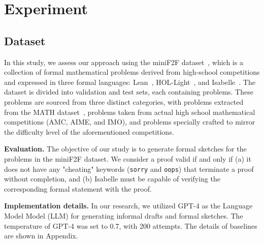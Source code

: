 \documentclass{article} \usepackage{iclr2024_conference,times}
\begin{document}
\section{Experiment}
\subsection{Dataset}
In this study, we assess our approach using the miniF2F dataset~\citep{zheng2021minif2f}, which is a collection of  formal mathematical problems derived from high-school competitions and expressed in three formal languages: Lean~\citep{de2015lean}, HOL-Light~\citep{bansal2019holist}, and Isabelle~\citep{paulson1994isabelle}. The dataset is divided into validation and test sets, each containing  problems. These problems are sourced from three distinct categories, with  problems extracted from the MATH dataset~\citep{hendrycks2021measuring},  problems taken from actual high school mathematical competitions (AMC, AIME, and IMO), and  problems specially crafted to mirror the difficulty level of the aforementioned competitions.

\textbf{Evaluation.} The objective of our study is to generate formal sketches for the problems in the miniF2F dataset. We consider a proof valid if and only if (a) it does not have any "cheating" keywords (\texttt{sorry} and \texttt{oops}) that terminate a proof without completion, and (b) Isabelle must be capable of verifying the corresponding formal statement with the proof.

\textbf{Implementation details.} In our research, we utilized GPT-4 as the Language Model Model (LLM) for generating informal drafts and formal sketches. The temperature of GPT-4 was set to 0.7, with 200 attempts. The details of baselines are shown in Appendix.
\end{document}
